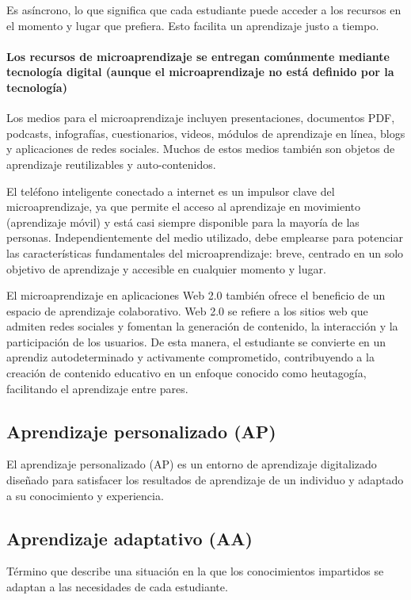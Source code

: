 Es asíncrono, lo que significa que cada estudiante puede acceder a los recursos
en el momento y lugar que prefiera. Esto facilita un aprendizaje justo a tiempo.
\cite{article:when_i_say_microlearning}

\paragraph{\textbf{Los recursos de microaprendizaje se entregan comúnmente
mediante tecnología digital (aunque el microaprendizaje no está definido por la
tecnología)}}

Los medios para el microaprendizaje incluyen presentaciones, documentos PDF,
podcasts, infografías, cuestionarios, videos, módulos de aprendizaje en línea,
blogs y aplicaciones de redes sociales. Muchos de estos medios también son
objetos de aprendizaje reutilizables y auto-contenidos. 

El teléfono inteligente conectado a internet es un impulsor clave del
microaprendizaje, ya que permite el acceso al aprendizaje en movimiento
(aprendizaje móvil) y está casi siempre disponible para la mayoría de las
personas. Independientemente del medio utilizado, debe emplearse para potenciar
las características fundamentales del microaprendizaje: breve, centrado en un
solo objetivo de aprendizaje y accesible en cualquier momento y lugar.

El microaprendizaje en aplicaciones Web 2.0 también ofrece el beneficio de un
espacio de aprendizaje colaborativo. Web 2.0 se refiere a los sitios web que
admiten redes sociales y fomentan la generación de contenido, la interacción y
la participación de los usuarios. De esta manera, el estudiante se convierte en
un aprendiz autodeterminado y activamente comprometido, contribuyendo a la
creación de contenido educativo en un enfoque conocido como heutagogía,
facilitando el aprendizaje entre pares.
\cite{article:when_i_say_microlearning}

\subsection{Aprendizaje personalizado (AP)}
El aprendizaje personalizado (AP) es un entorno de aprendizaje digitalizado
diseñado para satisfacer los resultados de aprendizaje de un individuo y
adaptado a su conocimiento y experiencia.
\cite{article:elearning_future_trends_shahid}

\subsection{Aprendizaje adaptativo (AA)}
Término que describe una situación en la que los conocimientos impartidos se
adaptan a las necesidades de cada estudiante.
\cite{article:elearning_future_trends_shahid}
